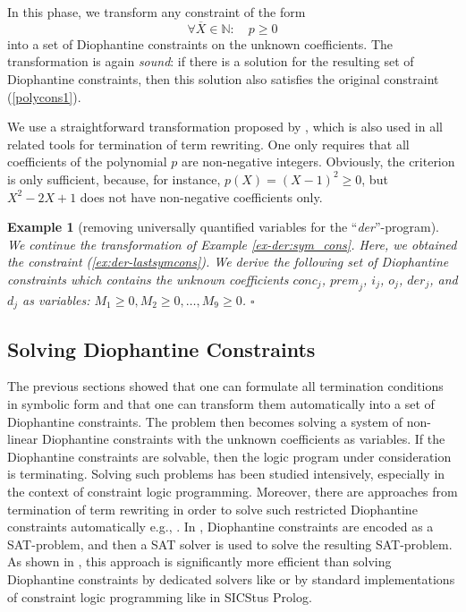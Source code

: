 \documentclass[envcountsame]{tlp}
\newcounter{polycons2ctr}
\newcounter{auxctr}
\newcounter{polycons1ctr}
\newcounter{ex:der-lastsymconsctr}
\newtheorem{example}{Example}
\begin{document}
\vspace*{.2cm}

\noindent
In this phase, we transform any constraint of the form
\setcounter{auxctr}{\value{equation}}
\setcounter{equation}{\value{polycons1ctr}}
 \begin{equation}
   \forall \overline{X} \in \mathbb{N}: \quad p \ge 0
\end{equation}
into a set of Diophantine
constraints on the unknown coefficients. 
The transformation is again \emph{sound}:
if
there is a solution for the resulting set of Diophantine constraints,
then 
this solution also satisfies 
the original constraint (\ref{polycons1}).
\setcounter{equation}{\value{auxctr}}

We use a straightforward transformation proposed by \cite{Hongetal98}, which
is also  used in all
related 
tools for termination of term rewriting. One only requires that all
coefficients of the polynomial $p$ are non-negative integers. Obviously, the criterion
is only sufficient, because, for instance,
$p(X) = (X - 1)^2 \ge 0$, but $X^2 - 2 X + 1$ does not have non-negative
coefficients only.

\begin{example}[removing universally quantified variables for the ``\textit{der}''-program] 
\label{positivenessexample}
We continue the transformation of Example \ref{ex-der:sym_cons}. Here, we
obtained the constraint (\ref{ex:der-lastsymcons}).
We derive the following set of Diophantine 
constraints which contains the unknown coefficients $\mathit{conc}_j$,
$\mathit{prem}_j$, $i_j$, $o_j$, $\mathit{der}_j$, and 
$d_j$ as variables: $M_1 \ge 0, M_2 \ge 0, \ldots, M_9 \ge 0$.
\hfill{$\square$}
\end{example}


\subsection{Solving Diophantine Constraints}
\label{Solving Diophantine Constraints}

The previous sections showed that one can formulate all termination conditions in
symbolic form and that one can transform them automatically into a set of Diophantine
constraints. The problem then becomes solving a system of non-linear
Diophantine constraints with the unknown coefficients as variables.
If the Diophantine constraints are solvable, then the logic program under
consideration is terminating. 
Solving such problems has been studied 
intensively, especially in
the context of constraint logic programming.
Moreover, there are approaches from termination of term rewriting in order to
solve such restricted Diophantine constraints automatically e.g.,
\cite{SMTCADE09,contejean05jar,Fuhsc07}.
In
\cite{Fuhsc07}, Diophantine constraints are encoded as a SAT-problem, and then a SAT
solver is used to solve the resulting SAT-problem. As shown in \cite{Fuhsc07},
this approach is significantly more efficient than solving 
Diophantine constraints by 
dedicated  solvers like \cite{contejean05jar} or by standard
implementations of constraint logic programming like in \textsf{SICStus Prolog}.
\end{document}
